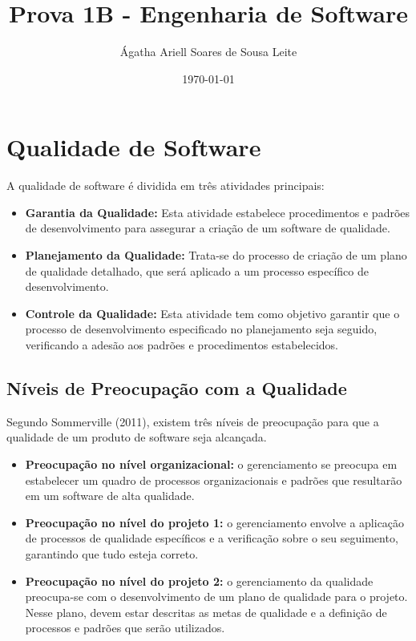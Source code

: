 \documentclass{article}
\begin{document}
\title{Prova 1B - Engenharia de Software}
\author{Ágatha Ariell Soares de Sousa Leite}
\date{\today}
\section*{Qualidade de Software}

A qualidade de software é dividida em três atividades principais:

\begin{itemize}
    \item \textbf{Garantia da Qualidade:} Esta atividade estabelece procedimentos e padrões de desenvolvimento para assegurar a criação de um software de qualidade.

    \item \textbf{Planejamento da Qualidade:} Trata-se do processo de criação de um plano de qualidade detalhado, que será aplicado a um processo específico de desenvolvimento.

    \item \textbf{Controle da Qualidade:} Esta atividade tem como objetivo garantir que o processo de desenvolvimento especificado no planejamento seja seguido, verificando a adesão aos padrões e procedimentos estabelecidos.
\end{itemize}

\subsection*{Níveis de Preocupação com a Qualidade}

Segundo Sommerville (2011), existem três níveis de preocupação para que a qualidade de um produto de software seja alcançada.

\begin{itemize}
    \item \textbf{Preocupação no nível organizacional:} o gerenciamento se preocupa em estabelecer um quadro de processos organizacionais e padrões que resultarão em um software de alta qualidade.

    \item \textbf{Preocupação no nível do projeto 1:} o gerenciamento envolve a aplicação de processos de qualidade específicos e a verificação sobre o seu seguimento, garantindo que tudo esteja correto.

    \item \textbf{Preocupação no nível do projeto 2:} o gerenciamento da qualidade preocupa-se com o desenvolvimento de um plano de qualidade para o projeto. Nesse plano, devem estar descritas as metas de qualidade e a definição de processos e padrões que serão utilizados.
\end{itemize}
\end{document}
